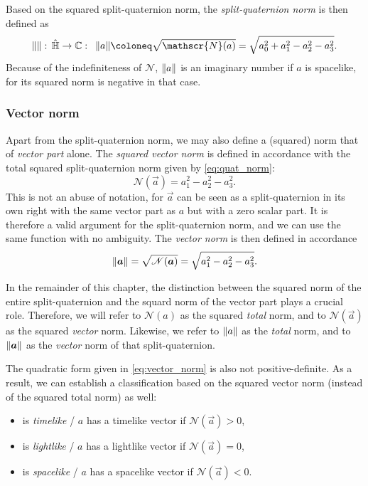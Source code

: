 Based on the squared split-quaternion norm, the \emph{split-quaternion norm} is then defined as
\begin{equation}
     \norm{}:\, \spquaternions \to \complex: \;\: \norm{a} \coloneq \sqrt{\mathscr{N}(a)} = \sqrt{a_0^2 + a_1^2 - a_2^2 - a_3^2}.
\end{equation}
Because of the indefiniteness of $\mathscr{N}$, $\norm{a}$ is an imaginary number if $a$ is spacelike, for its squared norm is negative in that case.

\subsubsection{Vector norm}
Apart from the split-quaternion norm, we may also define a (squared) norm that of \emph{vector part} alone. The \emph{squared vector norm} is defined in accordance with the total squared split-quaternion norm given by \cref{eq:quat_norm}:
\begin{equation}
     \mathscr{N}(\vec{a}) = a_1^2 - a^2_2 - a^2_3.
     \label{eq:vector_norm}
\end{equation}
This is not an abuse of notation, for \(\vec{a}\) can be seen as a split-quaternion in its own right with the same vector part as \(a\) but with a zero scalar part. It is therefore a valid argument for the split-quaternion norm, and we can use the same function with no ambiguity. The \emph{vector norm} is then defined in accordance 
\begin{equation}
    \norm{\vec{a}} = \sqrt{\mathscr{N}(\vec{a})} = \sqrt{a_1^2 - a_2^2 - a_3^2}. 
\end{equation}

In the remainder of this chapter, the distinction between the squared norm of the entire split-quaternion and the squard norm of the vector part plays a crucial role. Therefore, we will refer to \(\mathscr{N}(a)\) as the squared \emph{total} norm, and to \(\mathscr{N}(\vec{a})\) as the squared \emph{vector} norm. Likewise, we refer to $\norm{a}$ as the \emph{total} norm, and to $\norm{\vec{a}}$ as the \emph{vector} norm of that split-quaternion.

The quadratic form given in \cref{eq:vector_norm} is also not positive-definite. As a result, we can establish a classification based on the squared vector norm (instead of the squared total norm) as well:
\begin{itemize}
    \item {} is \emph{timelike} / $a$ has a timelike vector if $\mathscr{N}(\vec{a}) > 0$,
    \item {} is \emph{lightlike} / $a$ has a lightlike vector if $\mathscr{N}(\vec{a}) = 0$,
    \item {} is \emph{spacelike} / $a$ has a spacelike vector if $\mathscr{N}(\vec{a}) < 0$.
\end{itemize}

